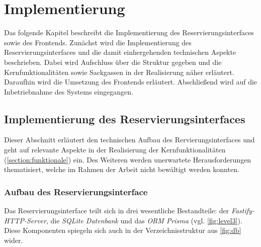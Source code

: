 
\chapter{Implementierung}
\label{chapter-implementierung}
Das folgende Kapitel beschreibt die Implementierung des Reservierungsinterfaces sowie des Frontends.
Zunächst wird die Implementierung des Reservierungsinterfaces und die damit einhergehenden
technischen Aspekte beschrieben. Dabei wird Aufschluss über die Struktur gegeben und die
Kernfunktionalitäten sowie Sackgassen in der Realisierung
näher erläutert. Daraufhin wird die Umsetzung des Frontends erläutert. Abschließend wird auf die
Inbetriebnahme des Systems eingegangen.




\section{Implementierung des Reservierungsinterfaces}
Dieser Abschnitt erläutert den technischen Aufbau des Rervierungsinterfaces und geht auf relevante
Aspekte in der Realisierung der Kernfunktionalitäten (\ref{section:funktionale}) ein. Des Weiteren
werden unerwartete Herausforderungen thematisiert, welche im Rahmen der Arbeit nicht bewältigt
werden konnten.


\subsection{Aufbau des Reservierungsinterface}
Das Reservierungsinterface teilt sich in drei wesentliche Bestandteile: der
\textit{Fastify-HTTP-Server}, die \textit{SQLite Datenbank} und das \textit{ORM Prisma} (vgl.
\ref{fig:level3}). Diese Komponenten spiegeln sich auch in der Verzeichnisstruktur aus \ref{fig:db}
wider.

